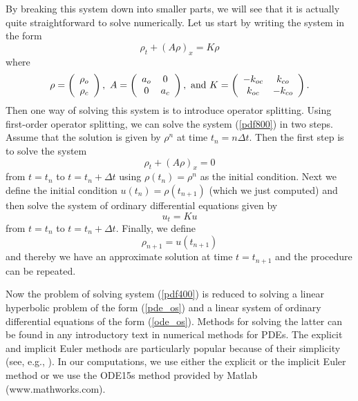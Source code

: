 By breaking this system down into smaller parts, we will see that it
is actually quite straightforward to solve numerically. Let us start by
writing the system in the form
\begin{equation}
\rho_{t}+(A\rho)_{x}=K\rho \label{pdf800}
\end{equation}
where
\begin{equation}
\rho=\left(
\begin{array}
[c]{c}
\rho_{o}\\
\rho_{c}
\end{array}
\right)  ,\text{ }A=\left(
\begin{array}
[c]{cc}
a_{o} & 0\\
0 & a_{c}
\end{array}
\right)  ,\text{ and }K=\left(
\begin{array}
[c]{cc}
-k_{oc} & k_{co}\\
k_{oc} & -k_{co}
\end{array}
\right)  .
\end{equation}
Then one way of solving this system is to introduce operator splitting. Using
first-order operator splitting, we can solve the system (\ref{pdf800}) in two steps.
Assume that the solution is given by $\rho^{n}$ at time $t_{n}=n\Delta t.$
Then the first step is to solve the system
\begin{equation}
\rho_{t}+(A\rho)_{x}=0\label{pde_os}
\end{equation}
from $t=t_{n}$ to $t=t_{n}+\Delta t$ using $\rho(t_{n})=\rho^{n}$ as the
initial condition. Next we define the initial condition $u(t_{n})=\rho
(t_{n+1})$ (which we just computed) and then solve the system of ordinary
differential equations given by
\begin{equation}
u_{t}=Ku\label{ode_os}
\end{equation}
from $t=t_{n}$ to $t=t_{n}+\Delta t$.
Finally, we define
\begin{equation}
\rho_{n+1}=u(t_{n+1})
\end{equation}
and thereby we have an approximate solution at time $t=t_{n+1}$ and the 
procedure can be repeated. 

\bigskip 
Now the problem of solving system (\ref{pdf400}) is reduced to solving a
linear hyperbolic problem of the form (\ref{pde_os}) and a linear system of ordinary
differential equations of the form (\ref{ode_os}). Methods for solving the latter can be
found in any introductory text in numerical methods for PDEs. The explicit and implicit Euler methods are particularly popular
because of their simplicity (see, e.g., \cite{Tveito2010}). In our computations, we use either
the explicit or the implicit Euler method or we use the ODE15s method provided by Matlab (www.mathworks.com). 

